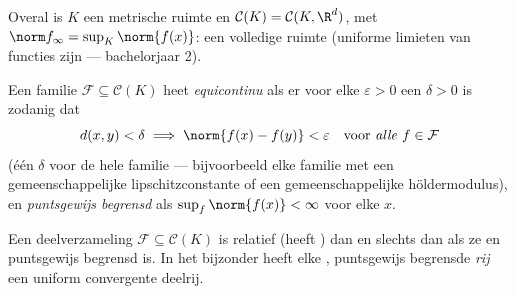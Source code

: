Overal is $K$ een \emph{} metrische ruimte en $\mathcal
C(K) = \mathcal C(K, \R^d)$, met $\norm f_\infty = \sup_K
\norm{f(x)}$: een volledige ruimte (uniforme limieten van 
functies zijn  --- bachelorjaar 2).

\begin{definition}\label{def:b3:complete:equicontinuous}
Een familie $\mathcal F \subseteq \mathcal C(K)$ heet
\emph{equicontinu} als er voor elke
$\varepsilon > 0$ een $\delta > 0$ is zodanig dat
\[
d(x, y) < \delta \implies \norm{f(x) - f(y)} < \varepsilon
\quad\text{voor \emph{alle} } f \in \mathcal F
\]
(één $\delta$ voor de hele familie --- bijvoorbeeld elke familie
met een gemeenschappelijke lipschitzconstante of een
gemeenschappelijke höldermodulus), en \emph{puntsgewijs begrensd}
als $\sup_{f}\norm{f(x)} < \infty$ voor elke $x$.
\end{definition}

\begin{theorem}\label{thm:b3:complete:ascoli}
Een deelverzameling $\mathcal F \subseteq \mathcal C(K)$ is
relatief  (heeft  ) dan en slechts dan
als ze  en puntsgewijs begrensd is. In het bijzonder
heeft elke , puntsgewijs begrensde \emph{rij} een
uniform convergente deelrij.
\end{theorem}

